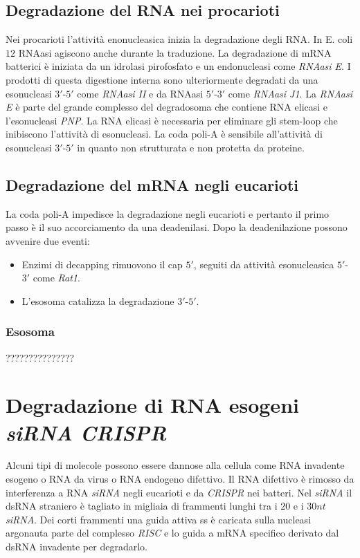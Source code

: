 \subsection{Degradazione del RNA nei procarioti}
Nei procarioti l'attivit\`a enonucleasica inizia la degradazione degli RNA. In E. coli $12$ RNAasi agiscono anche durante la traduzione. La degradazione di mRNA batterici \`e iniziata
da un idrolasi pirofosfato e un endonucleasi come \emph{RNAasi E}. I prodotti di questa digestione interna sono ulteriormente degradati da una esonucleasi $3'$-$5'$ come 
\emph{RNAasi II} e da RNAasi $5'$-$3'$ come \emph{RNAasi J1}. La \emph{RNAasi E} \`e parte del grande complesso del degradosoma che contiene RNA elicasi e l'esonucleasi \emph{PNP}. La
RNA elicasi \`e necessaria per eliminare gli stem-loop che inibiscono l'attivit\`a di esonucleasi. La coda poli-A \`e sensibile all'attivit\`a di esonucleasi $3'$-$5'$ in quanto 
non strutturata e non protetta da proteine. 
\subsection{Degradazione del mRNA negli eucarioti}
La coda poli-A impedisce la degradazione negli eucarioti e pertanto il primo passo \`e il suo accorciamento da una deadenilasi. Dopo la deadenilazione possono avvenire due eventi:
\begin{itemize}
	\item Enzimi di decapping rimuovono il cap $5'$, seguiti da attivit\`a esonucleasica $5'$-$3'$ come \emph{Rat1}.
	\item L'esosoma catalizza la degradazione $3'$-$5'$. 
\end{itemize}
\subsubsection{Esosoma}
???????????????
\section{Degradazione di RNA esogeni \emph{siRNA} \emph{CRISPR}}
Alcuni tipi di molecole possono essere dannose alla cellula come RNA invadente esogeno o RNA da virus o RNA endogeno difettivo. Il RNA difettivo \`e rimosso da interferenza a RNA
\emph{siRNA} negli eucarioti e da \emph{CRISPR} nei batteri. Nel \emph{siRNA} il dsRNA straniero \`e tagliato in migliaia di frammenti lunghi tra i $20$ e i $30nt$ \emph{siRNA}. 
Dei corti frammenti una guida attiva ss \`e caricata sulla nucleasi argonauta parte del complesso \emph{RISC} e lo guida a mRNA specifico derivato dal dsRNA invadente per degradarlo. 
